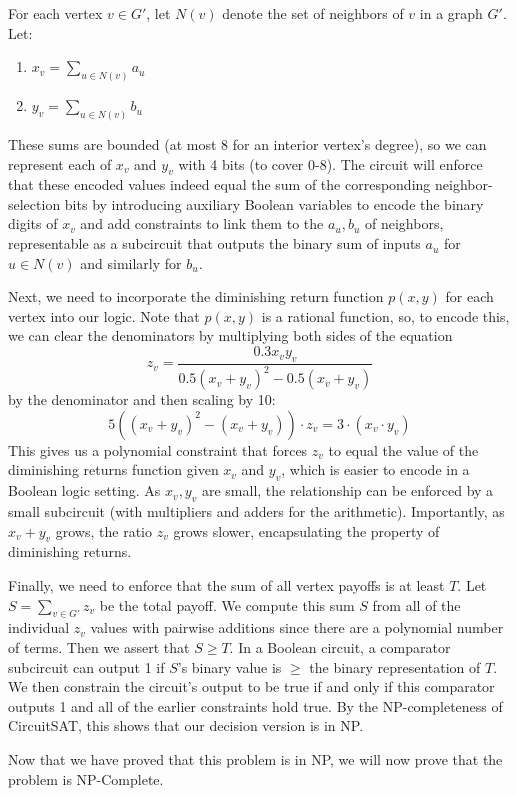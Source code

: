 \documentclass[11pt]{article}
\theoremstyle{plain}
\theoremstyle{definition}
\theoremstyle{remark}
\begin{document}
For each vertex $v \in G'$, let $N(v)$ denote the set of neighbors of $v$ in a graph $G'$. Let:
\begin{enumerate}
    \item $x_v = \sum_{u \in N(v)} a_u$
    \item $y_v = \sum_{u \in N(v)} b_u$
\end{enumerate}

These sums are bounded (at most 8 for an interior vertex's degree), so we can represent each of $x_v$ and $y_v$ with 4 bits (to cover 0-8). The circuit will enforce that these encoded values indeed equal the sum of the corresponding neighbor-selection bits by introducing auxiliary Boolean variables to encode the binary digits of $x_v$ and add constraints to link them to the $a_u, b_u$ of neighbors, representable as a subcircuit that outputs the binary sum of inputs $a_u$ for $u \in N(v)$ and similarly for $b_u$.

Next, we need to incorporate the diminishing return function $p(x,y)$ for each vertex into our logic. Note that $p(x,y)$ is a rational function, so, to encode this, we can clear the denominators by multiplying both sides of the equation
\[z_v= \frac{0.3x_v y_v}{0.5(x_v+y_v)^{2}-0.5(x_v+y_v)}\]
by the denominator and then scaling by 10:
\[5((x_v + y_v)^2 - (x_v + y_v)) \cdot z_v = 3 \cdot (x_v \cdot y_v)\]
This gives us a polynomial constraint that forces $z_v$ to equal the value of the diminishing returns function given $x_v$ and $y_v$, which is easier to encode in a Boolean logic setting. As $x_v, y_v$ are small, the relationship can be enforced by a small subcircuit (with multipliers and adders for the arithmetic). Importantly, as $x_v + y_v$ grows, the ratio $z_v$ grows slower, encapsulating the property of diminishing returns.

Finally, we need to enforce that the sum of all vertex payoffs is at least $T$. Let $S = \sum_{v \in G'} z_v$ be the total payoff. We compute this sum $S$ from all of the individual $z_v$ values with pairwise additions since there are a polynomial number of terms. Then we assert that $S \geq T$. In a Boolean circuit, a comparator subcircuit can output 1 if $S$'s binary value is $\geq$ the binary representation of $T$. We then constrain the circuit's output to be true if and only if this comparator outputs 1 and all of the earlier constraints hold true. By the NP-completeness of CircuitSAT, this shows that our decision version is in NP.

Now that we have proved that this problem is in NP, we will now prove that the problem is NP-Complete.
\end{document}
